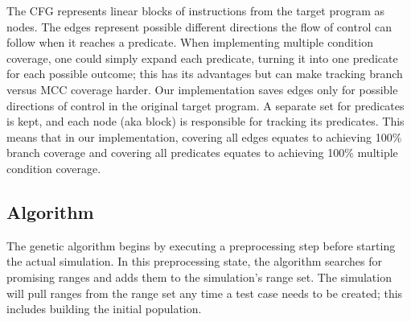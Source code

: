 \documentclass[runningheads]{llncs}
\begin{document}
The CFG represents linear blocks of instructions from the target program as nodes. The edges represent possible different directions the flow of control can follow when it reaches a predicate. When implementing multiple condition coverage, one could simply expand each predicate, turning it into one predicate for each possible outcome; this has its advantages but can make tracking branch versus MCC coverage harder. Our implementation saves edges only for possible directions of control in the original target program. A separate set for predicates is kept, and each node (aka block) is responsible for tracking its predicates. This means that in our implementation, covering all edges equates to achieving 100\% branch coverage and covering all predicates equates to achieving 100\% multiple condition coverage. 



\subsection{Algorithm}
The genetic algorithm begins by executing a preprocessing step before starting the actual simulation. In this preprocessing state, the algorithm searches for promising ranges and adds them to the simulation's range set. The simulation will pull ranges from the range set any time a test case needs to be created; this includes building the initial population.
\end{document}
